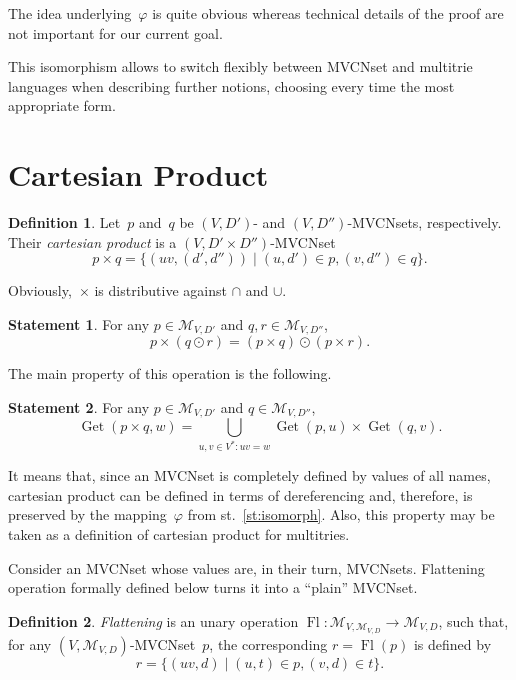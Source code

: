 \documentclass{article}
\theoremstyle{definition}
\newtheorem{Df}{Definition}
\newtheorem{St}{Statement}
\newcommand{\setcharmvcn}{M}
\newcommand{\setsymbol}[3]{\mathcal{#1}_{#2,#3}}
\newcommand{\setmvcn}[2]{\setsymbol{\setcharmvcn}{#1}{#2}}
\newcommand{\flatten}{\operatorname{Fl}}
\newcommand{\deref}{\operatorname{Get}}
\begin{document}
The idea underlying~$\varphi$ is quite obvious whereas technical details of the
proof are not important for our current goal.

This isomorphism allows to switch flexibly between MVCNset and multitrie
languages when describing further notions, choosing every time the most
appropriate form.


\section{Cartesian Product}

\begin{Df}\label{df:mvcn-cartesian}
Let~$p$ and~$q$ be $(V,D')$- and $(V,D'')$-MVCNsets, respectively. Their
\emph{cartesian product} is a $(V,D'\times D'')$-MVCNset
\[
  p\times q = \{ (uv, (d',d'')) \mid (u,d')\in p, (v,d'')\in q \} .
\]
\end{Df}

Obviously,~$\times$ is distributive against $\cap$ and $\cup$.
\begin{St}\label{st:cartesian-distributivity}
For any $p \in \setmvcn{V}{D'}$ and $q, r \in \setmvcn{V}{D''}$,
\[
  p\times(q\odot r) = (p\times q) \odot (p\times r) .
\]
\end{St}

The main property of this operation is the following.
\begin{St}\label{st:deref-cartesian}
For any $p \in \setmvcn{V}{D'}$ and $q \in \setmvcn{V}{D''}$,
\[
  \deref(p \times q, w) =
      \bigcup_{u,v\in V^\ast: uv = w}
          \deref(p, u)
          \times
          \deref(q, v) .
\]
\end{St}
It means that, since an MVCNset is completely defined by values of all names,
cartesian product can be defined in terms of dereferencing and, therefore,
is preserved by the mapping~$\varphi$ from st.~\ref{st:isomorph}. Also, this
property may be taken as a definition of cartesian product for multitries.

Consider an MVCNset whose values are, in their turn, MVCNsets.
Flattening operation formally defined below turns it into a ``plain'' MVCNset.
\begin{Df}\label{df:flatten}
\emph{Flattening} is an unary operation
$\flatten : \setmvcn{V}{\setmvcn{V}{D}} \to\setmvcn{V}{D}$,
such that, for any $(V,\setmvcn{V}{D})$-MVCNset~$p$, the
corresponding $r=\flatten(p)$ is defined by
\[
  r = \{ (uv, d) \mid (u, t) \in p, (v, d) \in t \} .
\]
\end{Df}
\end{document}
